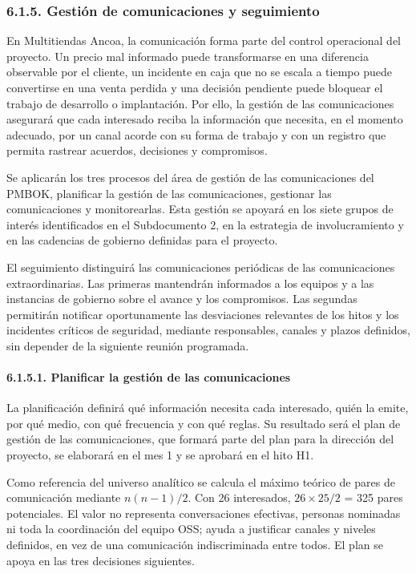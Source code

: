 \documentclass[11pt]{article}
\begin{document}
\subsubsection{6.1.5. Gestión de comunicaciones y seguimiento}\label{6-1-5-gestion-de-comunicaciones-y-seguimiento}

En Multitiendas Ancoa, la comunicación forma parte del control operacional del proyecto. Un precio mal informado puede transformarse en una diferencia observable por el cliente, un incidente en caja que no se escala a tiempo puede convertirse en una venta perdida y una decisión pendiente puede bloquear el trabajo de desarrollo o implantación. Por ello, la gestión de las comunicaciones asegurará que cada interesado reciba la información que necesita, en el momento adecuado, por un canal acorde con su forma de trabajo y con un registro que permita rastrear acuerdos, decisiones y compromisos.

Se aplicarán los tres procesos del área de gestión de las comunicaciones
del PMBOK, planificar la gestión de las comunicaciones, gestionar las
comunicaciones y monitorearlas. Esta gestión se apoyará en los siete
grupos de interés identificados en el Subdocumento 2, en la estrategia
de involucramiento y en las cadencias de gobierno definidas para el
proyecto.

El seguimiento distinguirá las comunicaciones periódicas de las
comunicaciones extraordinarias. Las primeras mantendrán informados a los
equipos y a las instancias de gobierno sobre el avance y los
compromisos. Las segundas permitirán notificar oportunamente las
desviaciones relevantes de los hitos y los incidentes críticos de
seguridad, mediante responsables, canales y plazos definidos, sin
depender de la siguiente reunión programada.

\paragraph{6.1.5.1. Planificar la gestión de las comunicaciones}\label{6-1-5-1-planificar-la-gestion-de-las-comunicaciones}

La planificación definirá qué información necesita cada interesado, quién la emite, por qué medio, con qué frecuencia y con qué reglas. Su resultado será el plan de gestión de las comunicaciones, que formará parte del plan para la dirección del proyecto, se elaborará en el mes 1 y se aprobará en el hito H1.

Como referencia del universo analítico se calcula el máximo teórico de
pares de comunicación mediante $n(n-1)/2$. Con 26 interesados, $26 \times 25/2$
= 325 pares potenciales. El valor no representa conversaciones
efectivas, personas nominadas ni toda la coordinación del equipo OSS;
ayuda a justificar canales y niveles definidos, en vez de una
comunicación indiscriminada entre todos. El plan se apoya en las tres
decisiones siguientes.
\end{document}
